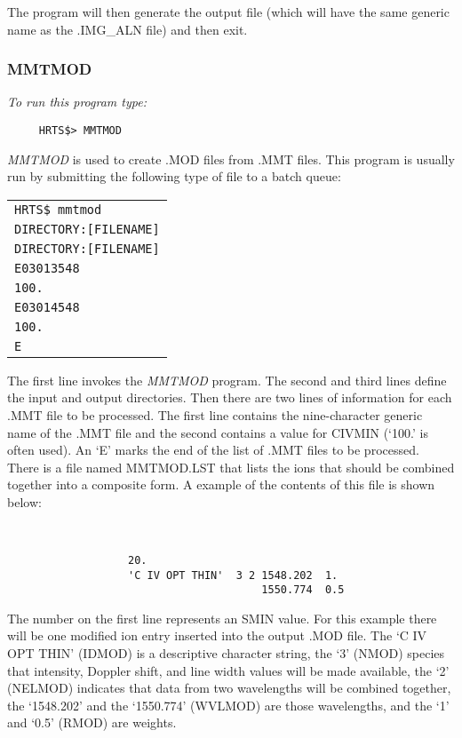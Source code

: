       The program will then generate the output file (which will have the
   same generic name as the .IMG\_ALN file) and then exit.

\subsubsection{MMTMOD}

{\em To run this program type:}
\begin{verbatim}
     HRTS$> MMTMOD
\end{verbatim}
{\em MMTMOD} is used to create .MOD files from .MMT files.  This program
   is usually run by submitting the following type of file to a batch queue:
\begin{center}
\begin{tabular}{||l||}
\hline

                      {\tt HRTS\$ mmtmod}  \\
                      {\tt DIRECTORY:[FILENAME]} \\
                      {\tt DIRECTORY:[FILENAME]} \\
                      {\tt E03013548}  \\
                      {\tt 100.}    \\
                      {\tt E03014548} \\
                      {\tt 100.} \\
                      {\tt E}  \\
\hline
\end{tabular}
\end{center}

      The first line invokes the {\em MMTMOD} program.  The second and third
   lines define the input and output directories.  Then there are two
   lines of information for each .MMT file to be processed.  The first
   line contains the nine-character generic name of the .MMT file and the
   second contains a value for CIVMIN (`100.' is often used).
   An `E' marks the end of the list of .MMT files to be processed.
      There is a file named MMTMOD.LST  that lists
   the ions that should be combined together into a composite form.  A
   example of the contents of this file is shown below:
\begin{center}
\begin{verbatim}


                   20.
                   'C IV OPT THIN'  3 2 1548.202  1.
                                        1550.774  0.5

\end{verbatim}
\end{center}
   The number on the first line represents an SMIN value. For this
   example there will be one modified ion entry inserted into the output
   .MOD file.  The `C IV OPT THIN' (IDMOD) is a descriptive character
   string, the `3' (NMOD) species that intensity, Doppler shift, and line
   width values will be made available, the `2' (NELMOD) indicates that
   data from two wavelengths will be combined together, the `1548.202' and
   the `1550.774' (WVLMOD) are those wavelengths, and the `1' and `0.5'
   (RMOD) are weights.

